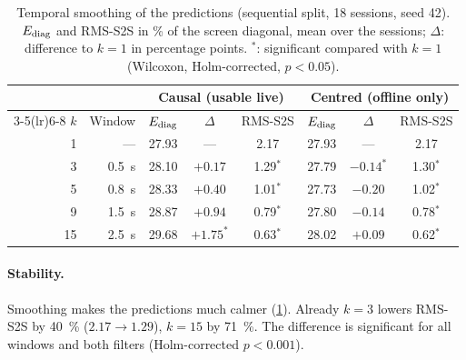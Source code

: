 \begin{table}[htbp]
  \centering
  \caption[Temporal smoothing of the predictions]{Temporal smoothing of the predictions (sequential split,
           18 sessions, seed 42). $E_{\mathrm{diag}}$ and RMS-S2S in \si{\percent} of the
           screen diagonal, mean over the sessions; $\Delta$: difference to
           $k=1$ in percentage points. $^{*}$: significant compared with $k=1$
           (Wilcoxon, Holm-corrected, $p<0.05$).}
  \label{tab:smoothing}
  \small
  \begin{tabular}{rr ccc ccc}
    \toprule
    & & \multicolumn{3}{c}{Causal (usable live)} & \multicolumn{3}{c}{Centred (offline only)} \\
    \cmidrule(lr){3-5}\cmidrule(lr){6-8}
    $k$ & Window & $E_{\mathrm{diag}}$ & $\Delta$ & RMS-S2S & $E_{\mathrm{diag}}$ & $\Delta$ & RMS-S2S \\
    \midrule
    1  & ---               & 27.93 & ---               & 2.17          & 27.93 & ---               & 2.17 \\
    3  & \SI{0.5}{\second} & 28.10 & $+0.17$           & 1.29$^{*}$    & 27.79 & $-0.14^{*}$       & 1.30$^{*}$ \\
    5  & \SI{0.8}{\second} & 28.33 & $+0.40$           & 1.01$^{*}$    & 27.73 & $-0.20$           & 1.02$^{*}$ \\
    9  & \SI{1.5}{\second} & 28.87 & $+0.94$           & 0.79$^{*}$    & 27.80 & $-0.14$           & 0.78$^{*}$ \\
    15 & \SI{2.5}{\second} & 29.68 & $+1.75^{*}$       & 0.63$^{*}$    & 28.02 & $+0.09$           & 0.62$^{*}$ \\
    \bottomrule
  \end{tabular}
\end{table}

\paragraph{Stability.} Smoothing makes the predictions much calmer
(\cref{tab:smoothing}). Already $k=3$ lowers RMS-S2S by \SI{40}{\percent}
($2.17 \rightarrow 1.29$), $k=15$ by \SI{71}{\percent}. The difference is
significant for all windows and both filters (Holm-corrected $p<0.001$).

